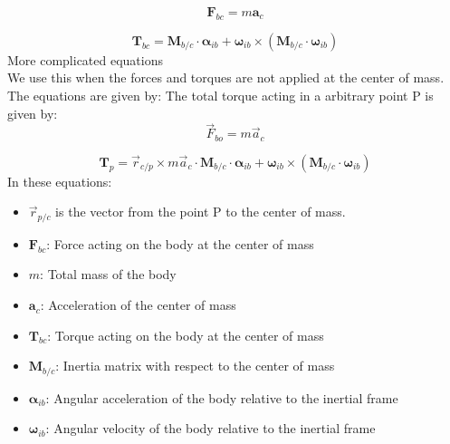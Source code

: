 \begin{equation}
    \mathbf{F}_{bc} = m \mathbf{a}_c
\end{equation}

\begin{equation}
    \mathbf{T}_{bc} = \mathbf{M}_{b/c} \cdot \boldsymbol{\alpha}_{ib} + \boldsymbol{\omega}_{ib} \times \left( \mathbf{M}_{b/c} \cdot \boldsymbol{\omega}_{ib} \right)
\end{equation}
More complicated equations \\
We use this when the forces and torques are not applied at the center of mass. The equations are given by:
The total torque acting in a arbitrary point P is given by:
\begin{equation}
    \vec{F}_{bo} = m \vec{a}_c
\end{equation}

\begin{equation}
    \mathbf{T}_{p} = \vec{r}_{c/p} \times m \vec{a}_c \cdot \mathbf{M}_{b/c} \cdot \boldsymbol{\alpha}_{ib} + \boldsymbol{\omega}_{ib} \times \left( \mathbf{M}_{b/c} \cdot \boldsymbol{\omega}_{ib} \right)
\end{equation}    
In these equations:
\begin{itemize}
    \item $\vec{r}_{p/c}$ is the vector from the point P to the center of mass.
    \item $\mathbf{F}_{bc}$: Force acting on the body at the center of mass
    \item $m$: Total mass of the body
    \item $\mathbf{a}_c$: Acceleration of the center of mass
    \item $\mathbf{T}_{bc}$: Torque acting on the body at the center of mass
    \item $\mathbf{M}_{b/c}$: Inertia matrix with respect to the center of mass
    \item $\boldsymbol{\alpha}_{ib}$: Angular acceleration of the body relative to the inertial frame
    \item $\boldsymbol{\omega}_{ib}$: Angular velocity of the body relative to the inertial frame
\end{itemize}


